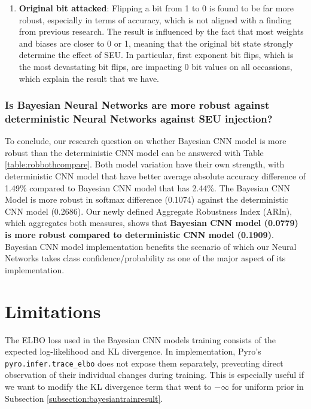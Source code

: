 \documentclass[ %
                    author={Revalda Putawara},
                supervisor={Dr. James Pope},
                    degree={MSc},
                     title={Robustness of Bayesian Neural Networks Design Choices Against Weight and Bias Perturbation Induced by Single Event Upsets (SEUs)},
                      type={},
                      year={2025}]{dissertation}
\begin{document}
\begin{enumerate}
\item \textbf{Original bit attacked}: Flipping a bit from 1 to 0 is found to be far more robust, especially in terms of accuracy, which is not aligned with a finding from previous research. The result is influenced by the fact that most weights and biases are closer to 0 or 1, meaning that the original bit state strongly determine the effect of SEU. In particular, first exponent bit flips, which is the most devastating bit flips, are impacting 0 bit values on all occassions, which explain the result that we have.
\end{enumerate}

\subsubsection{Is Bayesian Neural Networks are more robust against deterministic Neural Networks against SEU injection?}

To conclude, our research question on whether Bayesian CNN model is more robust than the deterministic CNN model can be answered with Table \ref{table:robbothcompare}. Both model variation have their own strength, with deterministic CNN model that have better average absolute accuracy difference of 1.49\% compared to Bayesian CNN model that has 2.44\%. The Bayesian CNN Model is more robust in softmax difference (0.1074) against the deterministic CNN model (0.2686). Our newly defined Aggregate Robustness Index (ARIn), which aggregates both measures, shows that \textbf{Bayesian CNN model (0.0779) is more robust compared to deterministic CNN model (0.1909)}. Bayesian CNN model implementation benefits the scenario of which our Neural Networks takes class confidence/probability as one of the major aspect of its implementation.

\section{Limitations}

The ELBO loss used in the Bayesian CNN models training consists of the expected log-likelihood and KL divergence. In implementation, Pyro's \texttt{pyro.infer.trace\_elbo} does not expose them separately, preventing direct observation of their individual changes during training. This is especially useful if we want to modify the KL divergence term that went to $-\infty$ for uniform prior in Subsection \ref{subsection:bayesiantrainresult}.
\end{document}
